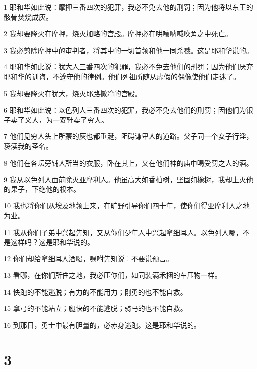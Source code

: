 \par 1 耶和华如此说：摩押三番四次的犯罪，我必不免去他的刑罚；因为他将以东王的骸骨焚烧成灰。
\par 2 我却要降火在摩押，烧灭加略的宫殿。摩押必在哄嚷呐喊吹角之中死亡。
\par 3 我必剪除摩押中的审判者，将其中的一切首领和他一同杀戮。这是耶和华说的。
\par 4 耶和华如此说：犹大人三番四次的犯罪，我必不免去他们的刑罚；因为他们厌弃耶和华的训诲，不遵守他的律例。他们列祖所随从虚假的偶像使他们走迷了。
\par 5 我却要降火在犹大，烧灭耶路撒冷的宫殿。
\par 6 耶和华如此说：以色列人三番四次的犯罪，我必不免去他们的刑罚；因他们为银子卖了义人，为一双鞋卖了穷人。
\par 7 他们见穷人头上所蒙的灰也都垂涎，阻碍谦卑人的道路。父子同一个女子行淫，亵渎我的圣名。
\par 8 他们在各坛旁铺人所当的衣服，卧在其上，又在他们神的庙中喝受罚之人的酒。
\par 9 我从以色列人面前除灭亚摩利人。他虽高大如香柏树，坚固如橡树，我却上灭他的果子，下绝他的根本。
\par 10 我也将你们从埃及地领上来，在旷野引导你们四十年，使你们得亚摩利人之地为业。
\par 11 我从你们子弟中兴起先知，又从你们少年人中兴起拿细耳人。以色列人哪，不是这样吗？这是耶和华说的。
\par 12 你们却给拿细耳人酒喝，嘱咐先知说：不要说预言。
\par 13 看哪，在你们所住之地，我必压你们，如同装满禾捆的车压物一样。
\par 14 快跑的不能逃脱；有力的不能用力；刚勇的也不能自救。
\par 15 拿弓的不能站立；腿快的不能逃脱；骑马的也不能自救。
\par 16 到那日，勇士中最有胆量的，必赤身逃跑。这是耶和华说的。

\chapter{3}

